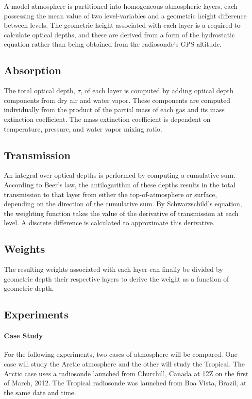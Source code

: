 \documentclass[twocol]{ametsoc}
\begin{document}
A model atmosphere is partitioned into homogeneous atmospheric layers, each possessing the mean value of two level-variables and a geometric height difference between levels.
The geometric height associated with each layer is a required to calculate optical depths, and these are derived from a form of the hydrostatic equation rather than being obtained from the radiosonde's GPS altitude.

\subsection{Absorption}

The total optical depth, $\tau$, of each layer is computed by adding optical depth components from dry air and water vapor.
These components are computed individually from the product of the partial mass of each gas and its mass extinction coefficient.
The mass extinction coefficient is dependent on temperature, pressure, and water vapor mixing ratio.

\subsection{Transmission}

An integral over optical depths is performed by computing a cumulative sum.
According to Beer's law, the antilogarithm of these depths results in the total transmission to that layer from either the top-of-atmosphere or surface, depending on the direction of the cumulative sum.
By Schwarzschild's equation, the weighting function takes the value of the derivative of transmission at each level.
A discrete difference is calculated to approximate this derivative.

\subsection{Weights}

The resulting weights associated with each layer can finally be divided by geometric depth their respective layers to derive the weight as a function of geometric depth.

\subsection{Experiments}

\paragraph*{Case Study} For the following experiments, two cases of atmosphere will be compared.
One case will study the Arctic atmosphere and the other will study the Tropical.
The Arctic case uses a radiosonde launched from Churchill, Canada at 12Z on the first of March, 2012.
The Tropical radiosonde was launched from Boa Vista, Brazil, at the same date and time.
\end{document}
